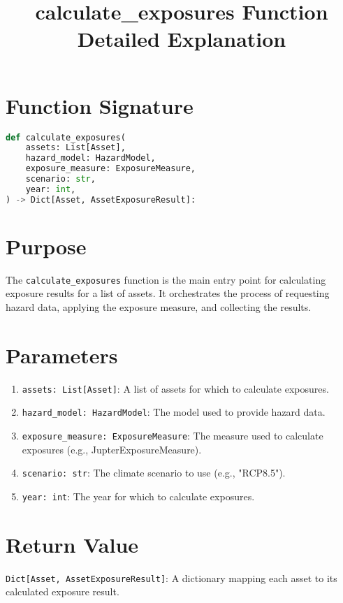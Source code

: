 \documentclass{article}
\title{calculate\_exposures Function Detailed Explanation}
\author{}
\date{}
\begin{document}
\maketitle

\section{Function Signature}

\begin{lstlisting}[language=Python]
def calculate_exposures(
    assets: List[Asset],
    hazard_model: HazardModel,
    exposure_measure: ExposureMeasure,
    scenario: str,
    year: int,
) -> Dict[Asset, AssetExposureResult]:
\end{lstlisting}

\section{Purpose}

The \texttt{calculate\_exposures} function is the main entry point for calculating exposure results for a list of assets. It orchestrates the process of requesting hazard data, applying the exposure measure, and collecting the results.

\section{Parameters}

\begin{enumerate}
    \item \texttt{assets: List[Asset]}: A list of assets for which to calculate exposures.
    \item \texttt{hazard\_model: HazardModel}: The model used to provide hazard data.
    \item \texttt{exposure\_measure: ExposureMeasure}: The measure used to calculate exposures (e.g., JupterExposureMeasure).
    \item \texttt{scenario: str}: The climate scenario to use (e.g., "RCP8.5").
    \item \texttt{year: int}: The year for which to calculate exposures.
\end{enumerate}

\section{Return Value}

\texttt{Dict[Asset, AssetExposureResult]}: A dictionary mapping each asset to its calculated exposure result.
\end{document}

